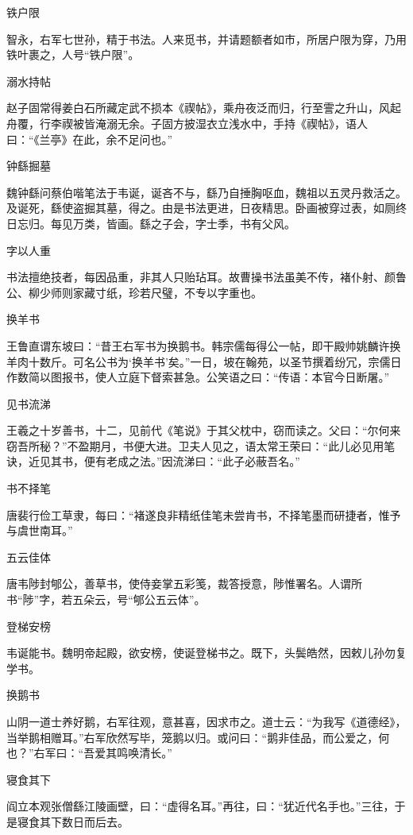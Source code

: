 \documentclass[a4paper,12pt,UTF8,twoside]{ctexbook}
\begin{document}
    铁户限
    
    智永，右军七世孙，精于书法。人来觅书，并请题额者如市，所居户限为穿，乃用铁叶裹之，人号“铁户限”。
    
    溺水持帖
    
    赵子固常得姜白石所藏定武不损本《禊帖》，乘舟夜泛而归，行至霅之升山，风起舟覆，行李禊被皆淹溺无余。子固方披湿衣立浅水中，手持《禊帖》，语人曰：“《兰亭》在此，余不足问也。”
    
    钟繇掘墓
    
    魏钟繇问蔡伯喈笔法于韦诞，诞吝不与，繇乃自捶胸呕血，魏祖以五灵丹救活之。及诞死，繇使盗掘其墓，得之。由是书法更进，日夜精思。卧画被穿过表，如厕终日忘归。每见万类，皆画。繇之子会，字士季，书有父风。
    
    字以人重
    
    书法擅绝技者，每因品重，非其人只贻玷耳。故曹操书法虽美不传，褚仆射、颜鲁公、柳少师则家藏寸纸，珍若尺璧，不专以字重也。
    
    换羊书
    
    王鲁直谓东坡曰：“昔王右军书为换鹅书。韩宗儒每得公一帖，即干殿帅姚麟许换羊肉十数斤。可名公书为‘换羊书’矣。”一日，坡在翰苑，以圣节撰着纷冗，宗儒日作数简以图报书，使人立庭下督索甚急。公笑语之曰：“传语：本官今日断屠。”
    
    见书流涕
    
    王羲之十岁善书，十二，见前代《笔说》于其父枕中，窃而读之。父曰：“尔何来窃吾所秘？”不盈期月，书便大进。卫夫人见之，语太常王荣曰：“此儿必见用笔诀，近见其书，便有老成之法。”因流涕曰：“此子必蔽吾名。”
    
    书不择笔
    
    唐裴行俭工草隶，每曰：“褚遂良非精纸佳笔未尝肯书，不择笔墨而研捷者，惟予与虞世南耳。”
    
    五云佳体
    
    唐韦陟封郇公，善草书，使侍妾掌五彩笺，裁答授意，陟惟署名。人谓所书“陟”字，若五朵云，号“郇公五云体”。
    
    登梯安榜
    
    韦诞能书。魏明帝起殿，欲安榜，使诞登梯书之。既下，头鬓皓然，因敕儿孙勿复学书。
    
    换鹅书
    
    山阴一道士养好鹅，右军往观，意甚喜，因求市之。道士云：“为我写《道德经》，当举鹅相赠耳。”右军欣然写毕，笼鹅以归。或问曰：“鹅非佳品，而公爱之，何也？”右军曰：“吾爱其鸣唤清长。”
    
    寝食其下
    
    阎立本观张僧繇江陵画壁，曰：“虚得名耳。”再往，曰：“犹近代名手也。”三往，于是寝食其下数日而后去。
    
\end{document}
